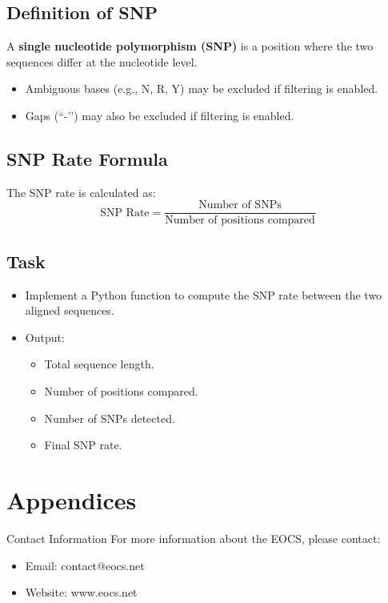 \documentclass[12pt]{article}
\newenvironment{conceptbox}{
      \begin{mdframed}[
        linecolor=eocsgold,
        backgroundcolor=eocslightgold,
        linewidth=1pt,
        innertopmargin=10pt,
        innerbottommargin=10pt,
        innerrightmargin=10pt,
        innerleftmargin=10pt,
        roundcorner=5pt]
      \vspace{0.5em}
    }{
      \end{mdframed}
      \vspace{1em}
    }
\begin{document}
\subsection*{Definition of SNP}
A \textbf{single nucleotide polymorphism (SNP)} is a position where the two sequences differ at the nucleotide level.  
\begin{itemize}[leftmargin=1.2cm]
    \item Ambiguous bases (e.g., N, R, Y) may be excluded if filtering is enabled.
    \item Gaps (``-’’) may also be excluded if filtering is enabled.
\end{itemize}

\subsection*{SNP Rate Formula}
The SNP rate is calculated as:
\[
\text{SNP Rate} = \frac{\text{Number of SNPs}}{\text{Number of positions compared}}
\]

\subsection*{Task}
\begin{itemize}[leftmargin=1.2cm]
    \item Implement a Python function to compute the SNP rate between the two aligned sequences.
    \item Output:
    \begin{itemize}
        \item Total sequence length.
        \item Number of positions compared.
        \item Number of SNPs detected.
        \item Final SNP rate.
    \end{itemize}
\end{itemize}


    
\clearpage
\section{Appendices}
    
\begin{conceptbox}{Contact Information}
For more information about the EOCS, please contact:
\begin{itemize}
    \item Email: contact@eocs.net
    \item Website: www.eocs.net
\end{itemize}
\end{conceptbox}
    
\end{document}
